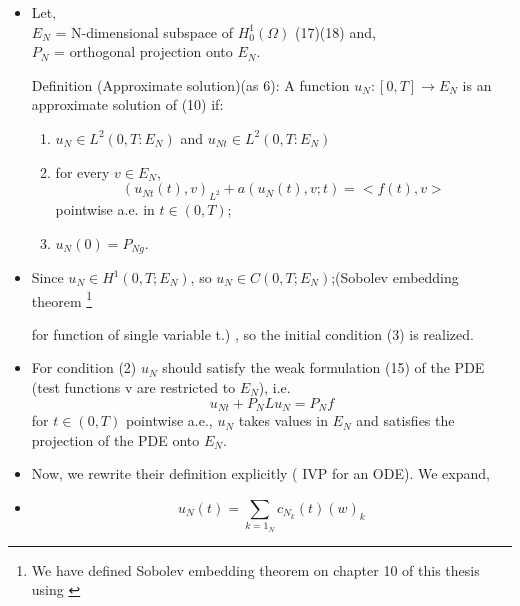 \begin{itemize}
\item Let,\\
$E_N$ = N-dimensional subspace of $H_0^1(\Omega)$ (17)(18) and,\\
$P_N$ = orthogonal projection onto $E_N$.
 
Definition (Approximate solution)(as 6): A function $u_N:[0, T] \xrightarrow{} E_N $ is an approximate solution of (10) if:
\begin{enumerate}
    \item $u_N \in L^2(0,T:E_N)$ and $u_{Nt} \in L^2(0,T:E_N)$
    \item for every $v \in E_N$,
    \begin{equation}
        (u_{Nt}(t),v)_{L^2} + a(u_N(t),v;t) = <f(t),v>
    \end{equation}
    pointwise a.e. in $t \in (0, T )$;
    \item $u_N(0) = P_{Ng}$.
\end{enumerate}
\item Since $u_N \in H^1(0,T;E_N)$, so  $u_N \in C(0,T;E_N)$;(Sobolev embedding theorem \footnote{We have defined Sobolev embedding theorem on chapter 10 of this thesis using \cite{sobolev}}







for function of single variable t.) , so the initial condition (3) is realized.
\item For condition (2) $u_N$ should satisfy the weak formulation (15)
of the PDE (test functions v are restricted to $E_N$), i.e.
\begin{equation*}
    u_{Nt} + P_NLu_N = P_Nf
\end{equation*}
for $t \in (0,T)$  pointwise a.e., \Rightarrow  $u_N$ takes values in $E_N$ and satisfies the projection of the PDE onto $E_N$.
\item Now, we rewrite their definition
explicitly ( IVP for an ODE). We expand,
\item \begin{equation}
u_{N}(t)=\sum_{k=1}_{N} c_{N}_{k}(t)(w)_{k}
\end{equation}


\end{itemize}
